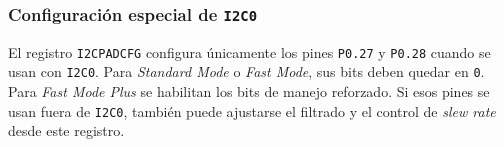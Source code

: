 \scriptsize
\renewcommand{\arraystretch}{1.12}
\setlength{\LTpre}{4pt}
\setlength{\LTpost}{10pt}

\subsubsection{Configuración especial de \texttt{I2C0}}
El registro \texttt{I2CPADCFG} configura únicamente los pines \texttt{P0.27} y \texttt{P0.28} cuando se usan con \texttt{I2C0}. Para \textit{Standard Mode} o \textit{Fast Mode}, sus bits deben quedar en \texttt{0}. Para \textit{Fast Mode Plus} se habilitan los bits de manejo reforzado. Si esos pines se usan fuera de \texttt{I2C0}, también puede ajustarse el filtrado y el control de \textit{slew rate} desde este registro.


